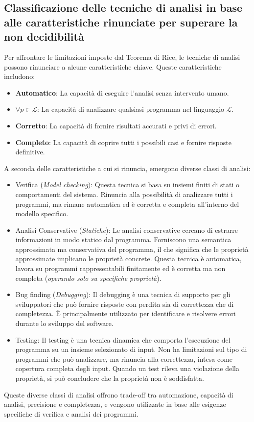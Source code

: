 \subsection{Classificazione delle tecniche di analisi in base alle caratteristiche rinunciate per superare la non decidibilità}
Per affrontare le limitazioni imposte dal Teorema di Rice, le tecniche di
analisi possono rinunciare a alcune caratteristiche chiave. Queste caratteristiche includono:
\begin{itemize}
    \item \textbf{Automatico}: La capacità di eseguire l'analisi senza intervento umano.
    \item \textbf{$\forall p \in \mathcal{L}$}: La capacità di analizzare qualsiasi programma nel linguaggio $\mathcal{L}$.
    \item \textbf{Corretto}: La capacità di fornire risultati accurati e privi di errori.
    \item \textbf{Completo}: La capacità di coprire tutti i possibili casi e fornire risposte definitive.
\end{itemize}
A seconda delle caratteristiche a cui si rinuncia, emergono diverse classi di analisi:
\begin{itemize}
    \item Verifica (\textit{Model checking}): Questa tecnica si basa su insiemi finiti di stati o comportamenti del sistema.
    Rinuncia alla possibilità di analizzare tutti i programmi, ma rimane automatica ed è corretta e completa all'interno del modello specifico.
    \item Analisi Conservative (\textit{Statiche}): Le analisi conservative cercano di estrarre informazioni in modo statico dal programma.
    Forniscono una semantica approssimata ma conservativa del programma, il che significa che le proprietà approssimate implicano le proprietà
    concrete. Questa tecnica è automatica, lavora su programmi
    rappresentabili finitamente ed è corretta ma non completa (\textit{operando solo su specifiche proprietà}).
    \item Bug finding (\textit{Debugging}): Il debugging è una tecnica di supporto per gli sviluppatori
    che può fornire risposte con perdita sia di correttezza che di completezza.
    È principalmente utilizzato per identificare e risolvere errori durante lo sviluppo del software.
    \item Testing: Il testing è una tecnica dinamica che comporta l'esecuzione del programma su un insieme selezionato di
    input. Non ha limitazioni sul tipo di programmi che può analizzare, ma rinuncia alla correttezza, intesa come copertura
    completa degli input. Quando un test rileva una
    violazione della proprietà, si può concludere che la proprietà non è soddisfatta.
\end{itemize}
Queste diverse classi di analisi offrono trade-off tra automazione, capacità di analisi, precisione e completezza,
e vengono utilizzate in base alle esigenze specifiche di verifica e analisi dei programmi.